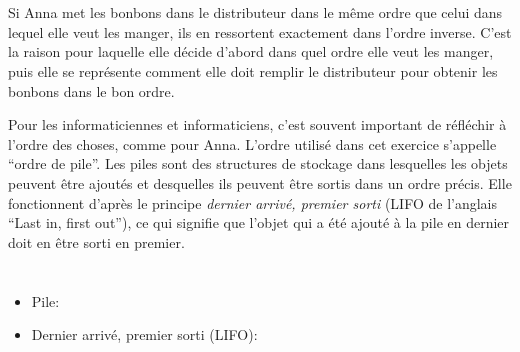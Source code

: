 {{{\centering%
\par}



\section*{\BrochureItsInformatics}
Si Anna met les bonbons dans le distributeur dans le même ordre que celui dans lequel elle veut les manger, ils en ressortent exactement dans l’ordre inverse. C’est la raison pour laquelle elle décide d’abord dans quel ordre elle veut les manger, puis elle se représente comment elle doit remplir le distributeur pour obtenir les bonbons dans le bon ordre.

Pour les informaticiennes et informaticiens, c’est souvent important de réfléchir à l’ordre des choses, comme pour Anna. L’ordre utilisé dans cet exercice s’appelle “ordre de pile”. Les piles sont des structures de stockage dans lesquelles les objets peuvent être ajoutés et desquelles ils peuvent être sortis dans un ordre précis. Elle fonctionnent d’après le principe \emph{dernier arrivé, premier sorti} (LIFO de l’anglais “Last in, first out”), ce qui signifie que l’objet qui a été ajouté à la pile en dernier doit en être sorti en premier.



\section*{\BrochureWebsitesAndKeywords}
{\raggedright
\begin{itemize}
  \item Pile: \href{https://fr.wikipedia.org/wiki/Pile_(informatique)}{}
  \item Dernier arrivé, premier sorti (LIFO): \href{https://fr.wikipedia.org/wiki/Last_in,_first_out}{}
\end{itemize}


}

}{}

\def\AuthorRoffeyC{} %
\def\AuthorDasovicD{} %
\def\AuthorEscherleN{} %
\def\AuthorVoborilF{} %
\def\AuthorDatzkoS{} %
\def\AuthorPohlW{} %
\def\AuthorPelletE{} %

\newpage}{}

